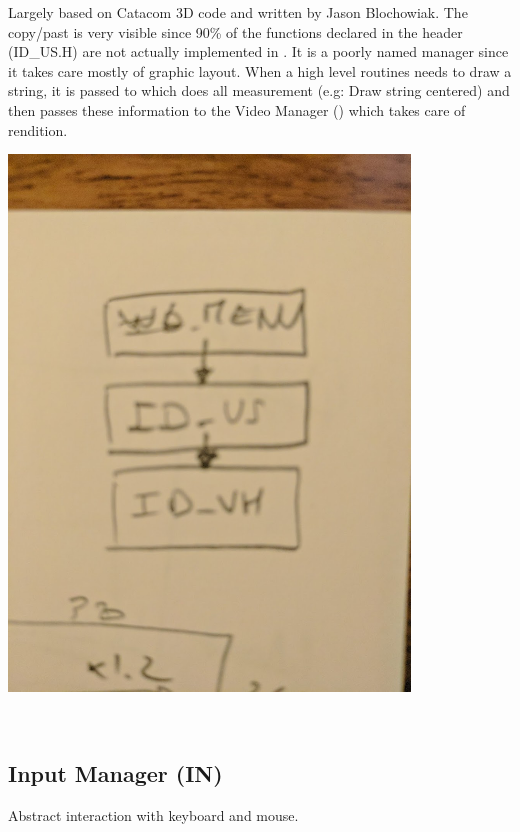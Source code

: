 \documentclass[book.tex]{subfiles}
\begin{document}
\begin{minipage}{0.7\textwidth}
Largely based on Catacom 3D code and written by Jason Blochowiak. The copy/past is very visible since 90\% of the functions declared in the header (ID\_US.H) are not actually implemented in . 
It is a poorly named manager since it takes care mostly of graphic layout. When a  high level routines needs to draw a string, it is passed to  which does all measurement (e.g: Draw string centered)
and then passes these information to the Video Manager () which takes care of rendition.
\end{minipage}
\begin{minipage}{0.3\textwidth}
\begin{flushright}
\includegraphics[width=0.8\textwidth]{imgs/US_explained.png}
\end{flushright}
\end{minipage}
\noindent
\\


\subsection{Input Manager (IN)}
Abstract interaction with keyboard and mouse.
\end{document}
